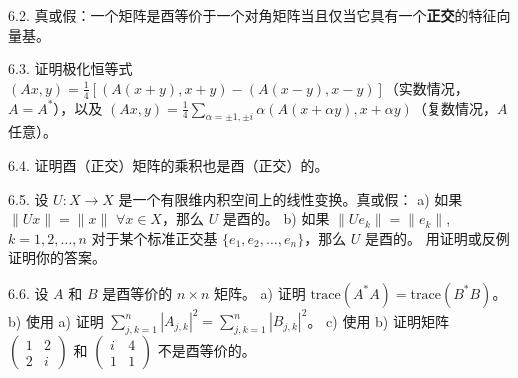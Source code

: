 6.2. 真或假：一个矩阵是酉等价于一个对角矩阵当且仅当它具有一个\textbf{正交}的特征向量基。

6.3. 证明极化恒等式 $(Ax, y) = \frac{1}{4} [ (A(x+y), x+y) - (A(x-y), x-y) ]$（实数情况，$A=A^*$），以及 $(Ax, y) = \frac{1}{4} \sum_{\alpha = \pm 1, \pm i} \alpha (A(x+\alpha y), x+\alpha y)$（复数情况，$A$ 任意）。

6.4. 证明酉（正交）矩阵的乘积也是酉（正交）的。

6.5. 设 $U: X \to X$ 是一个有限维内积空间上的线性变换。真或假：
a) 如果 $\|Ux\| = \|x\|$ $\forall x \in X$，那么 $U$ 是酉的。
b) 如果 $\|Ue_k\| = \|e_k\|$, $k=1, 2, \dots, n$ 对于某个标准正交基 $\{e_1, e_2, \dots, e_n\}$，那么 $U$ 是酉的。
用证明或反例证明你的答案。

6.6. 设 $A$ 和 $B$ 是酉等价的 $n \times n$ 矩阵。
a) 证明 $\text{trace}(A^*A) = \text{trace}(B^*B)$。
b) 使用 a) 证明 $\sum_{j,k=1}^n |A_{j,k}|^2 = \sum_{j,k=1}^n |B_{j,k}|^2$。
c) 使用 b) 证明矩阵 $\begin{pmatrix} 1 & 2 \\ 2 & i \end{pmatrix}$ 和 $\begin{pmatrix} i & 4 \\ 1 & 1 \end{pmatrix}$ 不是酉等价的。

